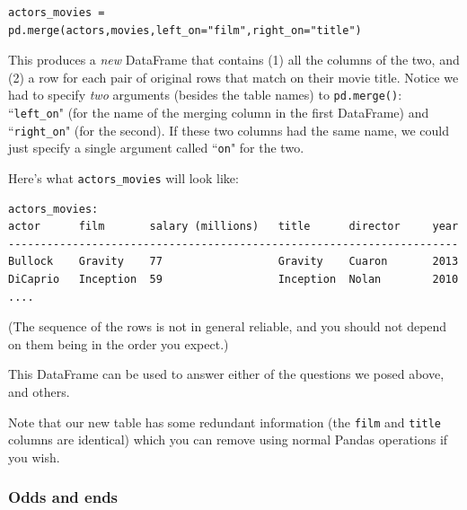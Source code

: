 \documentclass[12pt]{article}
\begin{document}
\begin{Verbatim}[fontsize=small,samepage=true,frame=none]
actors_movies = pd.merge(actors,movies,left_on="film",right_on="title")
\end{Verbatim}

This produces a \textit{new} DataFrame that contains (1) all the columns of
the two, and (2) a row for each pair of original rows that match on their
movie title. Notice we had to specify \textit{two} arguments (besides the
table names) to \texttt{pd.merge()}: ``\texttt{left\_on}" (for the name of the
merging column in the first DataFrame) and ``\texttt{right\_on}" (for the
second). If these two columns had the same name, we could just specify a
single argument called ``\texttt{on}" for the two.

\vspace{.2in}
Here's what \texttt{actors\_movies} will look like:
\begin{Verbatim}[fontsize=small,samepage=true,frame=none]
                            actors_movies:
actor      film       salary (millions)   title      director     year
----------------------------------------------------------------------
Bullock    Gravity    77                  Gravity    Cuaron       2013
DiCaprio   Inception  59                  Inception  Nolan        2010
....
\end{Verbatim}
(The sequence of the rows is not in general reliable, and you should not
depend on them being in the order you expect.)

This DataFrame can be used to answer either of the questions we posed above,
and others.

Note that our new table has some redundant information (the \texttt{film} and
\texttt{title} columns are identical) which you can remove using normal Pandas
operations if you wish.

\subsubsection{Odds and ends}
\end{document}
